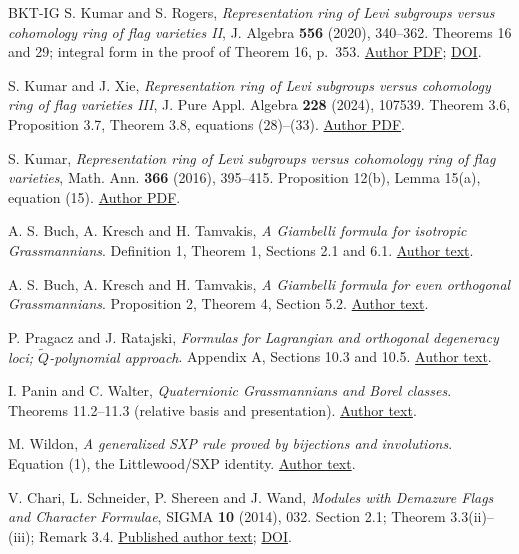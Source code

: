 \documentclass[11pt,letterpaper]{article}
\begin{document}
\newpage
\renewcommand{\refname}{References and companion material}
{\small
\setlength{\parskip}{2pt}
\begin{thebibliography}{BKT-IG}
S. Kumar and S. Rogers,
\emph{Representation ring of Levi subgroups versus cohomology ring of flag
varieties II}, J. Algebra \textbf{556} (2020), 340--362.
Theorems 16 and 29; integral form in the proof of Theorem 16, p.~353.
\href{https://kumar.math.unc.edu/papers/kumar81.pdf}{Author PDF};
\href{https://doi.org/10.1016/j.jalgebra.2020.02.029}{DOI}.

S. Kumar and J. Xie,
\emph{Representation ring of Levi subgroups versus cohomology ring of flag
varieties III}, J. Pure Appl. Algebra \textbf{228} (2024), 107539.
Theorem 3.6, Proposition 3.7, Theorem 3.8, equations (28)--(33).
\href{https://kumar.math.unc.edu/papers/kumar86.pdf}{Author PDF}.

S. Kumar,
\emph{Representation ring of Levi subgroups versus cohomology ring of flag
varieties}, Math. Ann. \textbf{366} (2016), 395--415.
Proposition 12(b), Lemma 15(a), equation (15).
\href{https://kumar.math.unc.edu/papers/kumar76.pdf}{Author PDF}.

A. S. Buch, A. Kresch and H. Tamvakis,
\emph{A Giambelli formula for isotropic Grassmannians}.
Definition 1, Theorem 1, Sections 2.1 and 6.1.
\href{https://math.umd.edu/~harryt/papers/isogiamfinal.pdf}{Author text}.

A. S. Buch, A. Kresch and H. Tamvakis,
\emph{A Giambelli formula for even orthogonal Grassmannians}.
Proposition 2, Theorem 4, Section 5.2.
\href{https://math.umd.edu/~harryt/papers/oggiam.pdf}{Author text}.

P. Pragacz and J. Ratajski,
\emph{Formulas for Lagrangian and orthogonal degeneracy loci;
\(\widetilde Q\)-polynomial approach}.
Appendix A, Sections 10.3 and 10.5.
\href{https://www.impan.pl/~pragacz/download/comp3868.pdf}{Author text}.

I. Panin and C. Walter, \emph{Quaternionic Grassmannians and Borel classes}.
Theorems 11.2--11.3 (relative basis and presentation).
\href{https://arxiv.org/pdf/1011.0649}{Author text}.

M. Wildon, \emph{A generalized SXP rule proved by bijections and
involutions}. Equation (1), the Littlewood/SXP identity.
\href{https://arxiv.org/pdf/1508.07030}{Author text}.

V. Chari, L. Schneider, P. Shereen and J. Wand,
\emph{Modules with Demazure Flags and Character Formulae},
SIGMA \textbf{10} (2014), 032.
Section 2.1; Theorem 3.3(ii)--(iii); Remark 3.4.
\href{https://arxiv.org/pdf/1310.5191}{Published author text};
\href{https://doi.org/10.3842/SIGMA.2014.032}{DOI}.


\end{thebibliography}}
\end{document}
